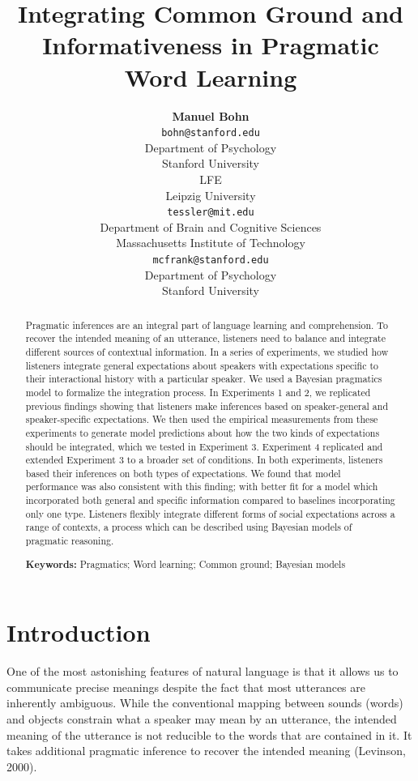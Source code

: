 \documentclass[10pt, letterpaper]{article}
\title{Integrating Common Ground and Informativeness in Pragmatic Word Learning}
\author{{\large \bf Manuel Bohn} \\ \texttt{bohn@stanford.edu} \\ Department of Psychology \\ Stanford University\\ LFE \\Leipzig University 
 \And {\large \bf Michael Henry Tessler} \\ \texttt{tessler@mit.edu} \\ Department of Brain and Cognitive Sciences \\ Massachusetts Institute of Technology
 \And {\large \bf Michael C. Frank} \\ \texttt{mcfrank@stanford.edu} \\ Department of Psychology \\ Stanford University}
\begin{document}
\maketitle

\begin{abstract}
Pragmatic inferences are an integral part of language learning and
comprehension. To recover the intended meaning of an utterance,
listeners need to balance and integrate different sources of contextual
information. In a series of experiments, we studied how listeners
integrate general expectations about speakers with expectations specific
to their interactional history with a particular speaker. We used a
Bayesian pragmatics model to formalize the integration process. In
Experiments 1 and 2, we replicated previous findings showing that
listeners make inferences based on speaker-general and speaker-specific
expectations. We then used the empirical measurements from these
experiments to generate model predictions about how the two kinds of
expectations should be integrated, which we tested in Experiment 3.
Experiment 4 replicated and extended Experiment 3 to a broader set of
conditions. In both experiments, listeners based their inferences on
both types of expectations. We found that model performance was also
consistent with this finding; with better fit for a model which
incorporated both general and specific information compared to baselines
incorporating only one type. Listeners flexibly integrate different
forms of social expectations across a range of contexts, a process which
can be described using Bayesian models of pragmatic reasoning.

\textbf{Keywords:}
Pragmatics; Word learning; Common ground; Bayesian models
\end{abstract}

\section{Introduction}\label{introduction}

One of the most astonishing features of natural language is that it
allows us to communicate precise meanings despite the fact that most
utterances are inherently ambiguous. While the conventional mapping
between sounds (words) and objects constrain what a speaker may mean by
an utterance, the intended meaning of the utterance is not reducible to
the words that are contained in it. It takes additional pragmatic
inference to recover the intended meaning (Levinson, 2000).
\end{document}
